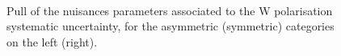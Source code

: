 \begin{figure}[tbhp]
    \caption{ Pull of the nuisances parameters associated to the W polarisation systematic uncertainty, 
      for the asymmetric (symmetric) categories on the left (right).
      \label{fig:nuisPull_WPol}}
  \begin{center}
     ~~
  \end{center}
\end{figure}


